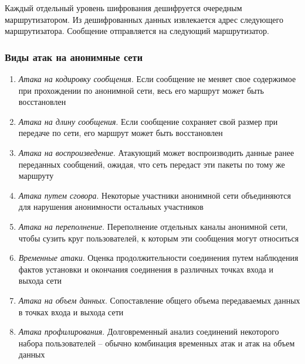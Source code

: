 Каждый отдельный уровень шифрования дешифруется очередным маршрутизатором. Из дешифрованных данных извлекается адрес следующего маршрутизатора. Сообщение отправляется на следующий маршрутизатор.

\subsubsection{Виды атак на анонимные сети}

\begin{enumerate}
    \item \textit{Атака на кодировку сообщения}. Если сообщение не меняет свое содержимое при прохождении по анонимной сети, весь его маршрут может быть восстановлен
    \item \textit{Атака на длину сообщения}. Если сообщение сохраняет свой размер при передаче по сети, его маршрут может быть восстановлен
    \item \textit{Атака на воспроизведение}. Атакующий может воспроизводить данные ранее переданных сообщений, ожидая, что сеть передаст эти пакеты по тому же маршруту
    \item \textit{Атака путем сговора}. Некоторые участники анонимной сети объединяются для нарушения анонимности остальных участников
    \item \textit{Атака на переполнение}. Переполнение отдельных каналы анонимной сети, чтобы сузить круг пользователей, к которым эти сообщения могут относиться
    \item \textit{Временные атаки}. Оценка продолжительности соединения путем наблюдения фактов установки и окончания соединения в различных точках входа и выхода сети
    \item \textit{Атака на объем данных}. Сопоставление общего объема передаваемых данных в точках входа и выхода сети
    \item \textit{Атака профилирования}. Долговременный анализ соединений некоторого набора пользователей -- обычно комбинация временных атак и атак на объем данных
\end{enumerate}
